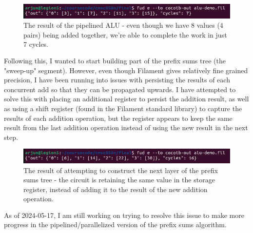 \documentclass[12pt]{article}
\begin{document}
\begin{figure}[H]
    \centering
    \includegraphics[width=\linewidth]{images/alu_result.png}
    \caption{The result of the pipelined ALU - even though we have 8 values (4 pairs) being added together, we're able to complete the
    work in just 7 cycles.}
\end{figure}

Following this, I wanted to start building part of the prefix sums tree (the "sweep-up" segment). However, even though Filament gives
relatively fine grained precision, I have been running into issues with persisting the results of each concurrent add so that they can be
propagated upwards. I have attempted to solve this with placing an additional register to persist the addition result, as well as using a
shift register (found in the Filament standard library) to capture the results of each addition operation, but the register appears to keep the
same result from the last addition operation instead of using the new result in the next step.

\begin{figure}[H]
    \centering
    \includegraphics[width=\linewidth]{images/alu_result_doubled.png}
    \caption{The result of attempting to construct the next layer of the prefix sums tree - the circuit is retaining the same value in
    the storage register, instead of adding it to the result of the new addition operation.}
\end{figure}

As of 2024-05-17, I am still working on trying to resolve this issue to make more progress in the pipelined/parallelized version of
the prefix sums algorithm.
\end{document}

